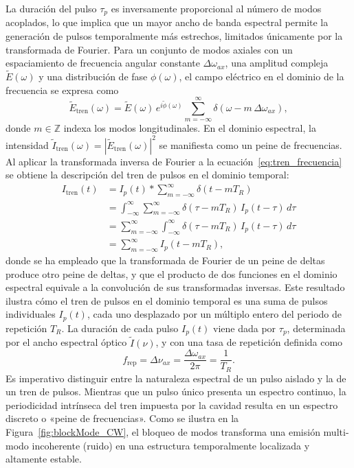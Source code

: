 La duración del pulso $\tau_p$ es inversamente proporcional al número de modos
acoplados, lo que implica que un mayor ancho de banda espectral permite la
generación de pulsos temporalmente más estrechos, limitados únicamente por la
transformada de Fourier. Para un conjunto de modos axiales con un espaciamiento de
frecuencia angular constante $\Delta\omega_{ax}$, una amplitud compleja
$\tilde{E}(\omega)$ y una distribución de fase $\phi(\omega)$, el campo eléctrico
en el dominio de la frecuencia se expresa como
%
\begin{equation}
    \tilde{E}_{\text{tren}}(\omega)
    = \tilde{E}(\omega)\,e^{i\tilde{\phi}(\omega)}
      \sum_{m=-\infty}^{\infty} \delta(\omega - m\,\Delta\omega_{ax}),
    \label{eq:tren_frecuencia}
\end{equation}
%
donde $m \in \mathbb{Z}$ indexa los modos longitudinales. En el dominio espectral,
la intensidad $\tilde{I}_{\text{tren}}(\omega) = |\tilde{E}_{\text{tren}}(\omega)|^2$
se manifiesta como un peine de frecuencias. Al aplicar la transformada inversa de
Fourier a la ecuación~\eqref{eq:tren_frecuencia} se obtiene la descripción del
tren de pulsos en el dominio temporal:
%
\begin{equation}
    \begin{aligned}
        I_{\text{tren}}(t)
        &= I_p(t) \ast \sum_{m=-\infty}^{\infty}\delta(t - mT_R)\\
        &= \int_{-\infty}^{\infty} \sum_{m=-\infty}^{\infty}
           \delta(\tau - mT_R)\, I_p(t - \tau)\, d\tau\\
        &= \sum_{m=-\infty}^{\infty}
           \int_{-\infty}^{\infty} \delta(\tau - mT_R)\, I_p(t - \tau)\, d\tau\\
        &= \sum_{m=-\infty}^{\infty} I_p(t - mT_R),
    \end{aligned}
    \label{eq:tren_tiempo}
\end{equation}
%
donde se ha empleado que la transformada de Fourier de un peine de deltas produce
otro peine de deltas, y que el producto de dos funciones en el dominio espectral
equivale a la convolución de sus transformadas inversas. Este resultado ilustra
cómo el tren de pulsos en el dominio temporal es una suma de pulsos individuales
$I_p(t)$, cada uno desplazado por un múltiplo entero del periodo de repetición
$T_R$. La duración de cada pulso $I_p(t)$ viene dada por $\tau_p$, determinada por
el ancho espectral óptico $\tilde{I}(\nu)$, y con una tasa de repetición definida
como
%
\begin{equation}
    f_{\text{rep}} = \Delta\nu_{ax}
    = \frac{\Delta\omega_{ax}}{2\pi} = \frac{1}{T_R}.
    \label{eq:tasa_repeticion}
\end{equation}
%
Es imperativo distinguir entre la naturaleza espectral de un pulso aislado y la de
un tren de pulsos. Mientras que un pulso único presenta un espectro continuo, la
periodicidad intrínseca del tren impuesta por la cavidad resulta en un espectro
discreto o «peine de frecuencias». Como se ilustra en la
Figura~\ref{fig:blockMode_CW}, el bloqueo de modos transforma una emisión
multi-modo incoherente (ruido) en una estructura temporalmente localizada y
altamente estable.

